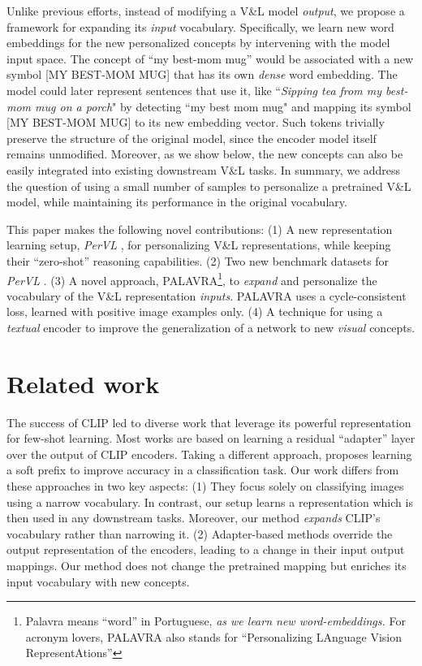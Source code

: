 \documentclass[runningheads]{llncs}
\newcommand{\VL}{V\&L {}}
\newcommand{\PerVL}{PerVL {}}
\begin{document}
Unlike previous efforts, instead of modifying a \VL model \textit{output}, we propose a framework for expanding its \textit{input} vocabulary.  Specifically, we learn new word embeddings for the new personalized concepts by intervening with the model input space. The concept of ``my best-mom mug'' would be associated with a new symbol [MY BEST-MOM MUG] that has its own \textit{dense} word embedding. The model could later represent sentences that use it, like ``\textit{Sipping tea from my best-mom mug on a porch}" by detecting ``my best mom mug" and mapping its symbol [MY BEST-MOM MUG] to its new embedding vector. Such tokens trivially preserve the structure of the original model, since the encoder model itself remains unmodified. Moreover, as we show below, the new concepts can also be easily integrated into existing downstream \VL tasks. In summary, we address the question of using a small number of samples to personalize a pretrained \VL model, while maintaining its performance in the original vocabulary.

This paper makes the following novel contributions: (1) A new
representation learning setup, \textit{\PerVL}\!\!, for personalizing  \VL representations, while keeping their ``zero-shot'' reasoning capabilities. (2) Two new benchmark datasets for \textit{\PerVL\!\!}.
(3) A novel approach, PALAVRA\footnote[7]{Palavra means ``word'' in Portuguese, \textit{as we learn new word-embeddings.} For acronym lovers, PALAVRA also stands for ``Personalizing LAnguage Vision RepresentAtions''},
to \textit{expand} and personalize the vocabulary of the \VL representation \textit{inputs}. PALAVRA uses a cycle-consistent loss,  learned with  positive image examples only.
(4) A technique for using a \textit{textual} encoder to improve the generalization of a network to new \textit{visual} concepts.

\section{Related work}
The success of CLIP led to diverse work that leverage its powerful representation for few-shot learning. Most works \cite{skantze2021collie,zhang2021tip,gao2021clip,ma2021simple} are based on learning a residual ``adapter'' layer \cite{houlsby2019parameter} over the output of CLIP encoders. Taking a different approach, \cite{zhou2021learning} proposes learning a soft prefix to improve accuracy in a classification task. Our work differs from these approaches in two key aspects:
(1) They focus solely on classifying images using a narrow vocabulary.
In contrast, our setup learns a representation which is then used in any downstream tasks. Moreover, our method \textit{expands} CLIP's vocabulary rather than narrowing it.
(2) Adapter-based methods override the output representation of the encoders, leading to a change in their input  output mappings. Our method does not change the pretrained mapping but enriches its input vocabulary with new concepts.
\end{document}
